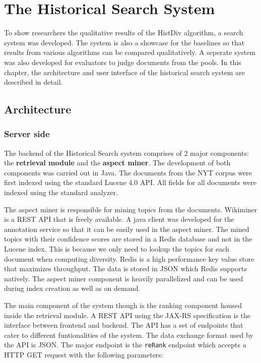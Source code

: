 \chapter{The Historical Search System} %
\label{cha:the_historical_search_system}

To show researchers the qualitative results of the HistDiv algorithm, a search system was developed. The system is also a showcase for the baselines so that results from various algorithms can be compared qualitatively. A seperate system was also developed for evaluators to judge documents from the pools. In this chapter, the architecture and user interface of the historical search system are described in detail.

\section{Architecture} %
\label{sec:Historical_search}

\subsection{Server side} %
\label{sub:server_side}

The backend of the Historical Search system comprises of 2 major components: the \textbf{retrieval module} and the \textbf{aspect miner}. The development of both components was carried out in Java. The documents from the NYT corpus were first indexed using the standard Lucene 4.0 API. All fields for all documents were indexed using the standard analyzer.

The aspect miner is responsible for mining topics from the documents. Wikiminer is a REST API that is freely available. A java client was developed for the annotation service so that it can be easily used in the aspect miner. The mined topics with their confidence scores are stored in a Redis database and not in the Lucene index. This is because we only need to lookup the topics for each document when computing diversity. Redis is a high performance key value store that maximizes throughput. The data is stored in JSON which Redis supports natively. The aspect miner component is heavily parallelized and can be used during index creation as well as on demand. 

The main component of the system though is the ranking component housed inside the retrieval module. A REST API using the JAX-RS specification is the interface between frontend and backend. The API has a set of endpoints that cater to different funtionalities of the system. The data exchange format used by the API is JSON. The major endpoint is the \texttt{reRank} endpoint which accepts a HTTP GET request with the following parameters:

